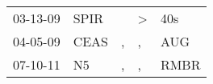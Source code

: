 \begin{supertabular}{p{0.07\textwidth}p{0.06\textwidth}p{0.02\textwidth}p{0.02\textwidth}p{0.06\textwidth}}
 03-13-09\textsuperscript{} &  SPIR\textsuperscript{} &    &  \textgreater &   40s\textsuperscript{} \\
 04-05-09\textsuperscript{} &  CEAS\textsuperscript{} &  , &             , &   AUG\textsuperscript{} \\
 07-10-11\textsuperscript{} &    N5\textsuperscript{} &  , &             , &  RMBR\textsuperscript{} \\
\end{supertabular}
